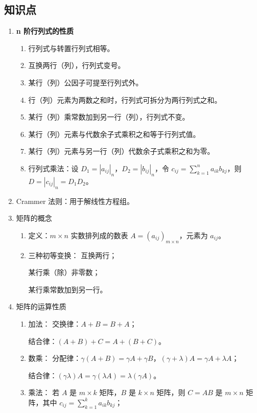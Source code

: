 \documentclass[UTF8]{ctexart}
\theoremstyle{remark}
\begin{document}
\subsection*{知识点}
\begin{enumerate}
	\item \textbf{n 阶行列式的性质  }
	\begin{enumerate}
		\item 行列式与转置行列式相等。  
		\item 互换两行（列），行列式变号。  
		\item 某行（列）公因子可提至行列式外。  
		\item 行（列）元素为两数之和时，行列式可拆分为两行列式之和。  
		\item 某行（列）乘常数加到另一行（列），行列式不变。  
		\item 某行（列）元素与代数余子式乘积之和等于行列式值。  
		\item 某行（列）元素与另一行（列）代数余子式乘积之和为零。  
		\item 行列式乘法：设 \(D_1 = |a_{ij}|_n\)，\(D_2 = |b_{ij}|_n\)，令 \(c_{ij} = \sum_{k=1}^n a_{ik}b_{kj}\)，则 \(D = |c_{ij}|_n = D_1D_2\)。  
	\end{enumerate}
	
	\item Crammer 法则：用于解线性方程组。  
	
	\item 矩阵的概念  
	\begin{enumerate}
		\item 定义：\(m \times n\) 实数排列成的数表 \(A = (a_{ij})_{m \times n}\)，元素为 \(a_{ij}\)。  
		\item 三种初等变换：  
互换两行；
		  
某行乘（除）非零数；  
		
某行乘常数加到另一行。  
	\end{enumerate}
	
	\item 矩阵的运算性质  
	\begin{enumerate}
		\item 加法：  
交换律：\(A + B = B + A\)；  
		
结合律：\((A + B) + C = A + (B + C)\)。  
		\item 数乘：  
分配律：\(\gamma(A + B) = \gamma A + \gamma B\)，\((\gamma + \lambda)A = \gamma A + \lambda A\)；  
		
结合律：\((\gamma\lambda)A = \gamma(\lambda A) = \lambda(\gamma A)\)。  
		\item 乘法：  
若 \(A\) 是 \(m \times k\) 矩阵，\(B\) 是 \(k \times n\) 矩阵，则 \(C = AB\) 是 \(m \times n\) 矩阵，其中 \(c_{ij} = \sum_{k=1}^k a_{ik}b_{kj}\)；  
		

\end{enumerate}
\end{enumerate}
\end{document}
